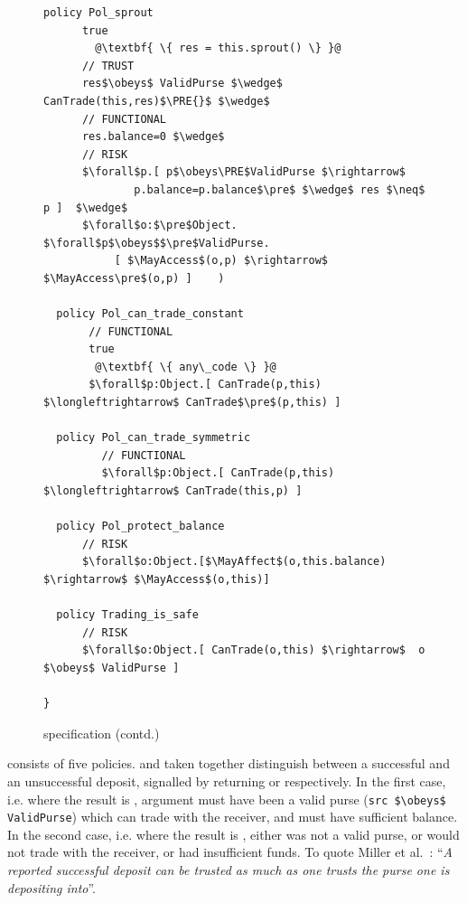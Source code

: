 \begin{figure}[htb]
\begin{lstlisting}[escapechar=@,firstnumber=32]
  policy Pol_sprout
      true
        @\textbf{ \{ res = this.sprout() \} }@
      // TRUST
      res$\obeys$ ValidPurse $\wedge$  CanTrade(this,res)$\PRE{}$ $\wedge$
      // FUNCTIONAL  
      res.balance=0 $\wedge$
      // RISK
      $\forall$p.[ p$\obeys\PRE$ValidPurse $\rightarrow$
              p.balance=p.balance$\pre$ $\wedge$ res $\neq$ p ]  $\wedge$
      $\forall$o:$\pre$Object. $\forall$p$\obeys$$\pre$ValidPurse.
           [ $\MayAccess$(o,p) $\rightarrow$ $\MayAccess\pre$(o,p) ]    )

  policy Pol_can_trade_constant
       // FUNCTIONAL
       true
        @\textbf{ \{ any\_code \} }@
       $\forall$p:Object.[ CanTrade(p,this) $\longleftrightarrow$ CanTrade$\pre$(p,this) ]

  policy Pol_can_trade_symmetric
         // FUNCTIONAL
         $\forall$p:Object.[ CanTrade(p,this) $\longleftrightarrow$ CanTrade(this,p) ]

  policy Pol_protect_balance
      // RISK
      $\forall$o:Object.[$\MayAffect$(o,this.balance) $\rightarrow$ $\MayAccess$(o,this)]

  policy Trading_is_safe
      // RISK
      $\forall$o:Object.[ CanTrade(o,this) $\rightarrow$  o $\obeys$ ValidPurse ]

}
\end{lstlisting}
\vspace*{-7mm}
\caption{ specification (contd.)}
\end{figure}

\newcommand{\sophiabullet}{}

 consists of five policies. %
\sophiabullet {}  and \sophiabullet {} taken together  distinguish between
a successful and an unsuccessful deposit, signalled by
returning  or  respectively. In the first case, i.e. 
where the result is ,
argument   must have been
a valid purse
%
(\lstinline+src $\obeys$ ValidPurse+)
%
which can trade with the receiver,
 and  must have sufficient balance. In the second case, i.e. 
where the result is ,
 either  was not a valid purse,
or would not trade with the receiver, or had insufficient
funds.
To quote Miller et al.~\cite{ELang}:
``\textit{A reported successful deposit can be trusted as much as one
  trusts the purse one is depositing into}''.


